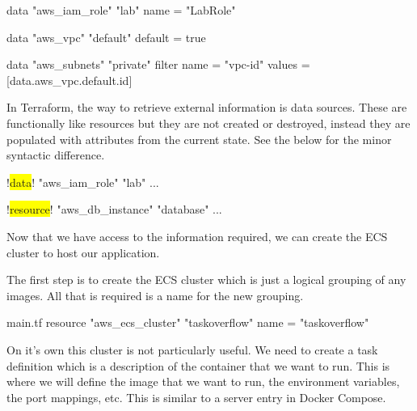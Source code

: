 \documentclass{csse4400}
\begin{document}
\begin{code}[language=terraform,numbers=none]{}
data "aws_iam_role" "lab" {
    name = "LabRole"
}

data "aws_vpc" "default" {
    default = true
}

data "aws_subnets" "private" {
    filter {
        name   = "vpc-id"
        values = [data.aws_vpc.default.id]
    }
}
\end{code}

In Terraform, the way to retrieve external information is data sources.
These are functionally like resources but they are not created or destroyed,
instead they are populated with attributes from the current state.
See the below for the minor syntactic difference.

\begin{code}[language=terraform,numbers=none,escapechar=!]{}
!\colorbox{yellow}{data}! "aws_iam_role" "lab" {
  ...
}

!\colorbox{yellow}{resource}! "aws_db_instance" "database" {
  ...
}
\end{code}


Now that we have access to the information required,
we can create the ECS cluster to host our application.

The first step is to create the ECS cluster
which is just a logical grouping of any images.
All that is required is a name for the new grouping.

\begin{code}[language=terraform,numbers=none]{main.tf}
resource "aws_ecs_cluster" "taskoverflow" {
    name = "taskoverflow"
}
\end{code}

On it's own this cluster is not particularly useful.
We need to create a task definition which is a description of the container that we want to run.
This is where we will define the image that we want to run,
the environment variables,
the port mappings, etc.
This is similar to a server entry in Docker Compose.

\end{document}
